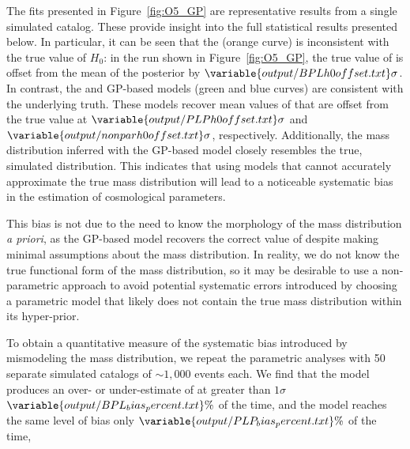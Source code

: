 \documentclass[preprint2,linenumbers]{aastex631}
\begin{document}
The fits presented in Figure~\ref{fig:O5_GP} are representative results from a single simulated catalog.
These provide insight into the full statistical results presented below.
In particular, it can be seen that the \bpl{} (orange curve) is inconsistent with the true value of $H_0$: in the run shown in Figure~\ref{fig:O5_GP}, the true value of \Ho{} is offset from the mean of the posterior by $\variable{output/BPLh0offset.txt}\sigma$.
In contrast, the \plp{} and \ac{GP}-based models (green and blue curves) are consistent with the underlying truth.
These models recover mean values of \Ho{} that are offset from the true value at $\variable{output/PLPh0offset.txt}\sigma$ and $\variable{output/nonparh0offset.txt}\sigma$, respectively. 
Additionally, the mass distribution inferred with the \ac{GP}-based model closely resembles the true, simulated distribution.
This indicates that using models that cannot accurately approximate the true mass distribution will lead to a noticeable systematic bias in the estimation of cosmological parameters.

This bias is not due to the need to know the morphology of the mass distribution \emph{a priori}, as the \ac{GP}-based model recovers the correct value of \Ho{} despite making minimal assumptions about the mass distribution.
In reality, we do not know the true functional form of the mass distribution, %
so it may be desirable to use a non-parametric approach to avoid potential systematic errors introduced by choosing a parametric model that likely does not contain the true mass distribution within its hyper-prior.

To obtain a quantitative measure of the systematic bias introduced by mismodeling the mass distribution, we repeat the parametric analyses with 50 separate simulated catalogs of $\sim1,000$ events each.
We find that the \bpl{} model produces an over- or under-estimate of \Ho{} at greater than $1\sigma$ $\variable{output/BPL_bias_percent.txt}\%$ of the time, %
and the \plp{} model reaches the same level of bias only $\variable{output/PLP_bias_percent.txt}\%$ 
of the time, 
\end{document}
